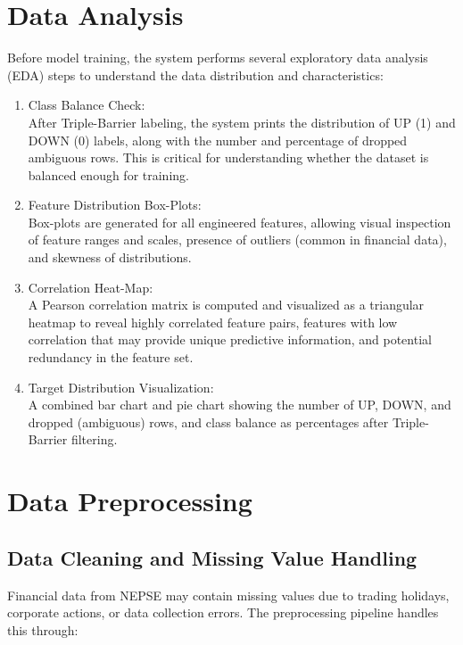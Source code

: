 \documentclass[12pt, a4paper]{report}
\begin{document}
	\section{Data Analysis}
	Before model training, the system performs several exploratory data analysis (EDA) steps to understand the data distribution and characteristics:
	
	\vspace{-18pt}
	\begin{enumerate}
		\renewcommand{\labelenumi}{\roman{enumi}.}
		\item Class Balance Check:\\
		After Triple-Barrier labeling, the system prints the distribution of UP (1) and DOWN (0) labels, along with the number and percentage of dropped ambiguous rows. This is critical for understanding whether the dataset is balanced enough for training.
		\item Feature Distribution Box-Plots:\\
		Box-plots are generated for all engineered features, allowing visual inspection of feature ranges and scales, presence of outliers (common in financial data), and skewness of distributions.
		\item Correlation Heat-Map:\\
		A Pearson correlation matrix is computed and visualized as a triangular heatmap to reveal highly correlated feature pairs, features with low correlation that may provide unique predictive information, and potential redundancy in the feature set.
		\item Target Distribution Visualization:\\
		A combined bar chart and pie chart showing the number of UP, DOWN, and dropped (ambiguous) rows, and class balance as percentages after Triple-Barrier filtering.
	\end{enumerate}
	
	\section{Data Preprocessing}
	
	\subsection{Data Cleaning and Missing Value Handling}
	Financial data from NEPSE may contain missing values due to trading holidays, corporate actions, or data collection errors. The preprocessing pipeline handles this through:
	
\end{document}
